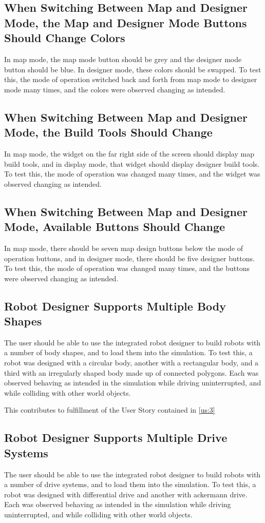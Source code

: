 \subsection{When Switching Between Map and Designer Mode, the Map and Designer Mode Buttons Should Change Colors}
In map mode, the map mode button should be grey and the designer mode button should be blue. In designer mode, these colors should be swapped. To test this, the mode of operation switched back and forth from map mode to designer mode many times, and the colors were observed changing as intended.

\subsection{When Switching Between Map and Designer Mode, the Build Tools Should Change}
In map mode, the widget on the far right side of the screen should display map build tools, and in display mode, that widget should display designer build tools. To test this, the mode of operation was changed many times, and the widget was observed changing as intended.

\subsection{When Switching Between Map and Designer Mode, Available Buttons Should Change}
In map mode, there should be seven map design buttons below the mode of operation buttons, and in designer mode, there should be five designer buttons. To test this, the mode of operation was changed many times, and the buttons were observed changing as intended.

\subsection{Robot Designer Supports Multiple Body Shapes}
The user should be able to use the integrated robot designer to build robots with a number of body shapes, and to load them into the simulation. To test this, a robot was designed with a circular body, another with a rectangular body, and a third with an irregularly shaped body made up of connected polygons. Each was observed behaving as intended in the simulation while driving uninterrupted, and while colliding with other world objects.

This contributes to fulfillment of the User Story contained in \ref{us:3}

\subsection{Robot Designer Supports Multiple Drive Systems}
The user should be able to use the integrated robot designer to build robots with a number of drive systems, and to load them into the simulation. To test this, a robot was designed with differential drive and another with ackermann drive. Each was observed behaving as intended in the simulation while driving uninterrupted, and while colliding with other world objects.

